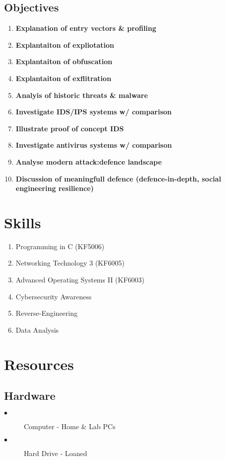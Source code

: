 \subsection{Objectives}
\begin{enumerate}
	\item \textbf{Explanation of entry vectors & profiling}
	\item \textbf{Explantaiton of expliotation}
	\item \textbf{Explantaiton of obfuscation}
	\item \textbf{Explantaiton of exflitration}
	\item \textbf{Analyis of historic threats & malware}
	\item \textbf{Investigate IDS/IPS systems w/ comparison}
	\item \textbf{Illustrate proof of concept IDS}
	\item \textbf{Investigate antivirus systems w/ comparison}
	\item \textbf{Analyse modern attack:defence landscape}
	\item \textbf{Discussion of meaningfull defence (defence-in-depth, social engineering resilience)}
\end{enumerate}


\section{Skills}
\begin{enumerate}
	\item Programming in C (KF5006)
	\item Networking Technology 3 (KF6005)
	\item Advanced Operating Systems II (KF6003)
	\item Cybersecurity Awareness
	\item Reverse-Engineering
	\item Data Analysis
\end{enumerate}

\section{Resources}
\subsection{Hardware}
\begin{description}
	\item[$\bullet$] Computer - Home & Lab PCs
	\item[$\bullet$] Hard Drive - Loaned
\end{description}

